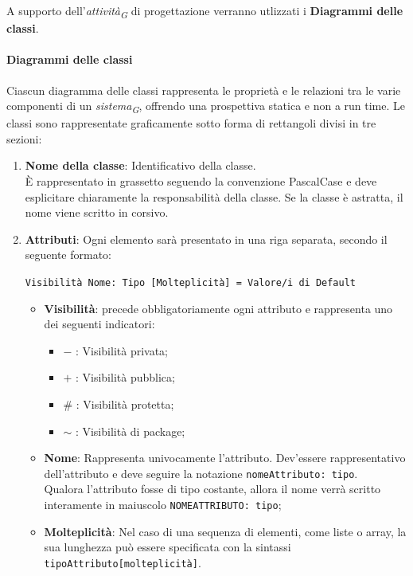 A supporto dell'\textit{attività}\textsubscript{\textit{G}} di progettazione verranno utlizzati i \textbf{Diagrammi delle classi}. \\

\paragraph*{Diagrammi delle classi}
Ciascun diagramma delle classi rappresenta le proprietà e le relazioni tra le varie componenti di un \textit{sistema}\textsubscript{\textit{G}}, offrendo una prospettiva statica e non a run time.
Le classi sono rappresentate graficamente sotto forma di rettangoli divisi in tre sezioni:
\begin{enumerate}
    \item \textbf{Nome della classe}: Identificativo della classe. \\
    È rappresentato in grassetto seguendo la convenzione PascalCase e deve esplicitare chiaramente la responsabilità della classe. Se la classe è astratta, il nome viene scritto in corsivo.
    \item \textbf{Attributi}: Ogni elemento sarà presentato in una riga separata, secondo il seguente formato: \\
    \begin{center}\texttt{Visibilità Nome: Tipo [Molteplicità] = Valore/i di Default}\end{center}
    \begin{itemize}
        \item \textbf{Visibilità}: precede obbligatoriamente ogni attributo e rappresenta uno dei seguenti indicatori:
        \begin{itemize}
            \item $-$ : Visibilità privata;
            \item $+$ : Visibilità pubblica;
            \item $\#$ : Visibilità protetta;
            \item $\sim$ : Visibilità di package;
        \end{itemize}
        \item \textbf{Nome}: Rappresenta univocamente l'attributo. Dev'essere rappresentativo dell'attributo e deve seguire la notazione \texttt{nomeAttributo: tipo}. \\
        Qualora l'attributo fosse di tipo costante, allora il nome verrà scritto interamente in maiuscolo \texttt{NOMEATTRIBUTO: tipo};
        \item \textbf{Molteplicità}: Nel caso di una sequenza di elementi, come liste o array, la sua lunghezza può essere specificata con la sintassi \texttt{tipoAttributo[molteplicità]}. \\

\end{itemize}
\end{enumerate}

